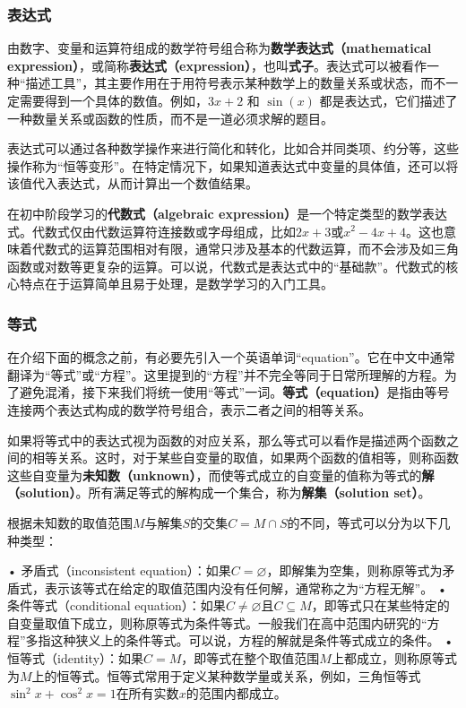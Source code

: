 \subsubsection{表达式}

由数字、变量和运算符组成的数学符号组合称为\textbf{数学表达式（mathematical expression）}，或简称\textbf{表达式（expression）}，也叫\textbf{式子}。表达式可以被看作一种“描述工具”，其主要作用在于用符号表示某种数学上的数量关系或状态，而不一定需要得到一个具体的数值。例如，$3x + 2$ 和 $\sin(x)$ 都是表达式，它们描述了一种数量关系或函数的性质，而不是一道必须求解的题目。

表达式可以通过各种数学操作来进行简化和转化，比如合并同类项、约分等，这些操作称为“恒等变形”。在特定情况下，如果知道表达式中变量的具体值，还可以将该值代入表达式，从而计算出一个数值结果。

在初中阶段学习的\textbf{代数式（algebraic expression）}是一个特定类型的数学表达式。代数式仅由代数运算符连接数或字母组成，比如$2x + 3$或$x^2 - 4x + 4$。这也意味着代数式的运算范围相对有限，通常只涉及基本的代数运算，而不会涉及如三角函数或对数等更复杂的运算。可以说，代数式是表达式中的“基础款”。代数式的核心特点在于运算简单且易于处理，是数学学习的入门工具。

\subsubsection{等式}

在介绍下面的概念之前，有必要先引入一个英语单词“equation”。它在中文中通常翻译为“等式”或“方程”。这里提到的“方程”并不完全等同于日常所理解的方程。为了避免混淆，接下来我们将统一使用“等式”一词。\textbf{等式（equation）}是指由等号连接两个表达式构成的数学符号组合，表示二者之间的相等关系。

如果将等式中的表达式视为函数的对应关系，那么等式可以看作是描述两个函数之间的相等关系。这时，对于某些自变量的取值，如果两个函数的值相等，则称函数这些自变量为\textbf{未知数（unknown）}，而使等式成立的自变量的值称为等式的\textbf{解（solution）}。所有满足等式的解构成一个集合，称为\textbf{解集（solution set）}。

根据未知数的取值范围$M$与解集$S$的交集$C = M \cap S$的不同，等式可以分为以下几种类型：

	•	矛盾式（inconsistent equation）：如果$C = \varnothing$，即解集为空集，则称原等式为矛盾式，表示该等式在给定的取值范围内没有任何解，通常称之为“方程无解”。
	•	条件等式（conditional equation）：如果$C \neq \varnothing$且$C \subseteq M$，即等式只在某些特定的自变量取值下成立，则称原等式为条件等式。一般我们在高中范围内研究的“方程”多指这种狭义上的条件等式。可以说，方程的解就是条件等式成立的条件。
	•	恒等式（identity）：如果$C = M$，即等式在整个取值范围$M$上都成立，则称原等式为$M$上的恒等式。恒等式常用于定义某种数学量或关系，例如，三角恒等式$\sin^2 x + \cos^2 x = 1$在所有实数$x$的范围内都成立。

